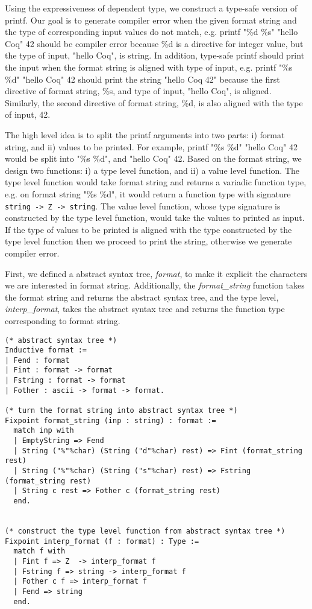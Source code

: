  
 Using the expressiveness of dependent type, we construct a type-safe version of 
 printf. Our goal is to generate compiler error when the given format string and the type of 
 corresponding input values  
 do not match, e.g. printf "\%d \%s" "hello Coq" 42 should be compiler error because
 \%d is a directive for integer value, but the type of input, "hello Coq", is string. In addition, 
 type-safe printf should print the input when the format string is aligned with type of input, e.g.
 printf "\%s \%d" "hello Coq" 42 should print the string "hello Coq  42" because the first directive 
 of format string, \%s, and type of input, "hello Coq", is aligned. Similarly, the second directive 
 of format string, \%d, is also aligned with the type of input, 42.
 
 The high level idea is to split the printf arguments into two parts: i) format string, 
 and ii) values to be printed. For example, printf "\%s \%d" "hello Coq" 42 would be split into "\%s \%d", and 
 "hello Coq" 42.  Based on the format string, we design two functions: i) a type level function, 
 and ii) a value level function. The type level function would 
 take format string and returns a variadic function type, e.g. 
 on format string "\%s \%d", it would return a function type with 
 signature \texttt{string -> Z  -> string}.
 The value level function, whose type signature 
 is constructed by the type level function, would take the values to printed as input. If the 
 type of values to be printed is aligned with the type constructed by the type level function then 
 we proceed to print the string, otherwise we generate compiler error.  
 


First, we defined a abstract syntax tree, \textit{format}, to make it explicit the characters we 
are interested in format string. Additionally, the \textit{format\_string} function takes the format string 
and returns the abstract syntax tree, and the type level, \textit{interp\_format}, takes the 
abstract syntax tree and returns the function type corresponding to format string.

\begin{verbatim}
(* abstract syntax tree *)
Inductive format :=
| Fend : format
| Fint : format -> format
| Fstring : format -> format
| Fother : ascii -> format -> format.

(* turn the format string into abstract syntax tree *)
Fixpoint format_string (inp : string) : format :=
  match inp with
  | EmptyString => Fend
  | String ("%"%char) (String ("d"%char) rest) => Fint (format_string rest)
  | String ("%"%char) (String ("s"%char) rest) => Fstring (format_string rest)
  | String c rest => Fother c (format_string rest)
  end.


(* construct the type level function from abstract syntax tree *)
Fixpoint interp_format (f : format) : Type :=
  match f with
  | Fint f => Z  -> interp_format f
  | Fstring f => string -> interp_format f
  | Fother c f => interp_format f
  | Fend => string
  end.
\end{verbatim}



